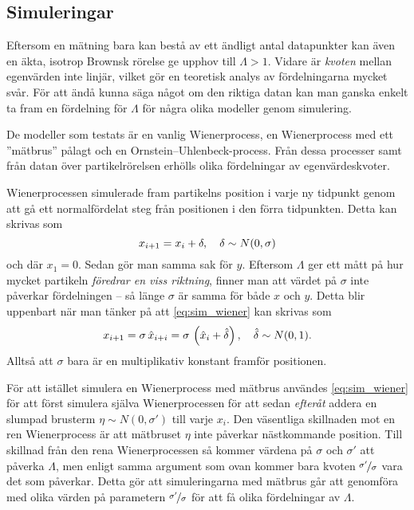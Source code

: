 
\subsection{Simuleringar}
Eftersom en mätning bara kan bestå av ett ändligt antal datapunkter kan även en äkta, isotrop Brownsk rörelse ge upphov till $\varLambda>1$. Vidare är \emph{kvoten} mellan egenvärden inte linjär, vilket gör en teoretisk analys av fördelningarna mycket svår. För att ändå kunna säga något om den riktiga datan kan man ganska enkelt ta fram en fördelning för $\varLambda$ för några olika modeller genom simulering. 

De modeller som testats är en vanlig Wienerprocess, en Wienerprocess med ett ''mätbrus'' pålagt och en Ornstein–Uhlenbeck-process. Från dessa processer samt från datan över partikelrörelsen erhölls olika fördelningar av egenvärdeskvoter. 

Wienerprocessen simulerade fram partikelns position i varje ny tidpunkt genom att gå ett normalfördelat steg från positionen i den förra tidpunkten. Detta kan skrivas som
\begin{equation}\label{eq:sim_wiener}
x_{i+1} = x_i + \delta 
\qcomma  \delta \sim N(0, \sigma)
\end{equation}
och där $x_1=0$. Sedan gör man samma sak för $y$. Eftersom $\varLambda$ ger ett mått på hur mycket partikeln \emph{föredrar en viss riktning}, finner man att värdet på $\sigma$ inte påverkar fördelningen -- så länge $\sigma$ är samma för både $x$ och $y$. Detta blir uppenbart när man tänker på att \eqref{eq:sim_wiener} kan skrivas som 
\begin{equation}
x_{i+1} =\sigma\,\hat{x}_{i+i} = \sigma\,\left( \hat{x}_i + \hat{\delta} \right) 
\qcomma  \hat{\delta} \sim N(0, 1).
\end{equation}
Alltså att $\sigma$ bara är en multiplikativ konstant framför positionen.

För att istället simulera en Wienerprocess med mätbrus användes \eqref{eq:sim_wiener} för att först simulera själva Wienerprocessen för att sedan \emph{efteråt} addera en slumpad brusterm $\eta \sim N(0, \sigma')$ till varje $x_i$. Den väsentliga skillnaden mot en ren Wienerprocess är att mätbruset $\eta$ inte påverkar nästkommande position. Till skillnad från den rena Wienerprocessen så kommer värdena på $\sigma$ och $\sigma'$ att påverka $\varLambda$, men enligt samma argument som ovan kommer bara kvoten $\nicefrac{\sigma'}{\sigma}$ vara det som påverkar. Detta gör att simuleringarna med mätbrus går att genomföra med olika värden på parametern $\nicefrac{\sigma'}{\sigma}$ för att få olika fördelningar av $\varLambda$. 

